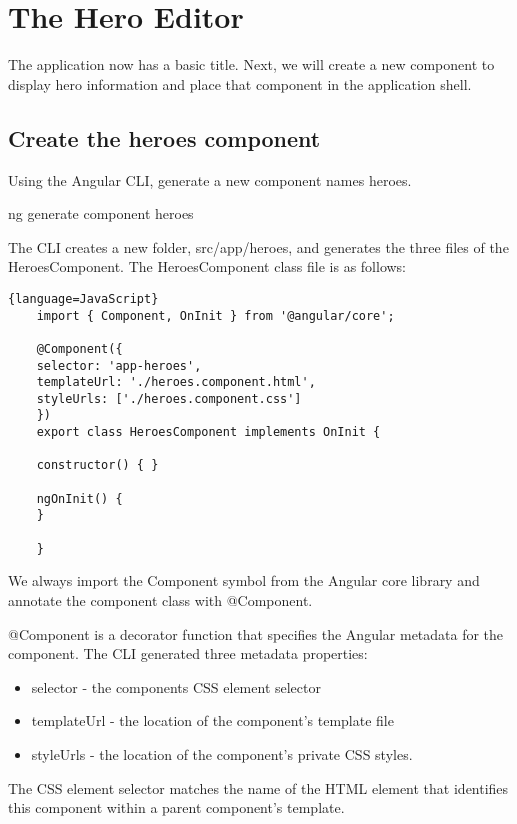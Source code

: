 \chapter{The Hero Editor}
The application now has a basic title. Next, we will create a new component to display hero information and place that component in the application shell.

\section{Create the heroes component}
Using the Angular CLI, generate a new component names heroes.

ng generate component heroes

The CLI creates a new folder, src/app/heroes, and generates the three files of the HeroesComponent. The HeroesComponent class file is as follows:

\begin{lstlisting}{language=JavaScript}
    import { Component, OnInit } from '@angular/core';

    @Component({
    selector: 'app-heroes',
    templateUrl: './heroes.component.html',
    styleUrls: ['./heroes.component.css']
    })
    export class HeroesComponent implements OnInit {

    constructor() { }

    ngOnInit() {
    }

    }

\end{lstlisting}

We always import the Component symbol from the Angular core library and annotate the component class with @Component.

@Component is a decorator function that specifies the Angular metadata for the component.
The CLI generated three metadata properties:
\begin{itemize}
    \item selector - the components CSS element selector
    \item templateUrl - the location of the component's template file
    \item styleUrls - the location of the component's private CSS styles.
\end{itemize}

The CSS element selector matches the name of the HTML element that identifies this component within a parent component's template.